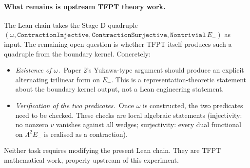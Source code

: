 \documentclass[11pt,a4paper]{article}
\begin{document}
\paragraph{What remains is upstream TFPT theory work.}
The Lean chain takes the Stage D quadruple
$(\omega, \texttt{ContractionInjective},
\texttt{ContractionSurjective}, \texttt{Nontrivial}\,E_-)$
as input. The remaining open question is whether TFPT itself
produces such a quadruple from the boundary kernel. Concretely:

\begin{itemize}[leftmargin=1.6em, itemsep=1pt]
\item \emph{Existence of $\omega$.}\ Paper 2's Yukawa-type
    argument should produce an explicit alternating trilinear
    form on $E_-$. This is a representation-theoretic statement
    about the boundary kernel output, not a Lean engineering
    statement.
\item \emph{Verification of the two predicates.}\ Once $\omega$
    is constructed, the two predicates need to be checked.
    These checks are local algebraic statements (injectivity:
    no nonzero $v$ vanishes against all wedges; surjectivity:
    every dual functional on $\Lambda^2 E_-$ is realised as a
    contraction).
\end{itemize}

Neither task requires modifying the present Lean chain. They are
TFPT mathematical work, properly upstream of this experiment.
\end{document}
